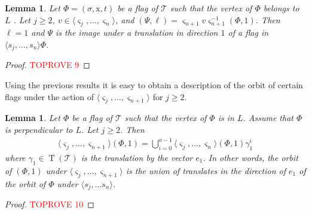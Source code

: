 \documentclass[final]{amsart}
\theoremstyle{plain}
\newtheorem{lem}[thm]{Lemma}
\theoremstyle{definition}
\theoremstyle{remark}
\numberwithin{equation}{section}
\renewcommand{\{}{\lbrace}
\renewcommand{\}}{\rbrace}
\newcommand{\cT}{\mathcal{T}}
\newcommand{\cyvec}[1]{{\mathrm{#1}}}
\newcommand{\vx}{\cyvec{x}}
\DeclareMathOperator{\tras}{T}
\newcommand{\es}{\varsigma}
\begin{document}
\begin{lem}\label{lem:translatedOfPerps} 
Let $\Phi= (\sigma,\vx,t)$ be a flag of $\cT$ such that the vertex  of $\Phi$ belongs to $L$ .  
  Let $j \geq 2$, $v \in \langle \es_{j}, \dots, \es_{n} \rangle$,
  and $(\Psi, \ell) = \es_{n+1} v \es_{n+1}^{-1}(\Phi, 1)$. 
  Then $\ell = 1$ and $\Psi$ is the image under a translation in direction $1$ of a flag in $\langle s_{j}, \dots, s_{n} \rangle \Phi$.
\end{lem}

\begin{proof}\textcolor{red}{TOPROVE 9}\end{proof}
















Using the previous results it is easy to obtain a description of the orbit of certain flags under the action of $\langle \es_{j}, \dots, \es_{n+1} \rangle$ for $j \geq 2$.


\begin{lem}\label{lem:IP_orbitGreatGens} 
  Let $\Phi$ be a flag of $\cT$ such that the vertex of $\Phi$ is in $L$. Assume that $\Phi$ is perpendicular to $L$. Let $j \geq 2$. Then
  \begin{equation}\label{eq:IP_orbitGreatGens}
	  \begin{split}
		  \langle \es_{j}, \dots, \es_{n+1}\rangle(\Phi,1) =\bigcup_{i=0}^{a-1} \langle \es_{j}, \dots, \es_{n}\rangle (\Phi,1)\gamma_{1}^{i}
	  \end{split}
  \end{equation}where $\gamma_{1} \in \tras(\cT)$ is the translation by the vector $e_{1}$. 
  In other words, the orbit of $(\Phi,1)$ under $\langle \es_{j}, \dots, \es_{n+1}\rangle$ is the union of translates in the direction of $e_1$  of the orbit of $\Phi$ under $\langle s_{j}, \dots s_{n}\rangle$. 
\end{lem}

\begin{proof}\textcolor{red}{TOPROVE 10}\end{proof}
\end{document}
